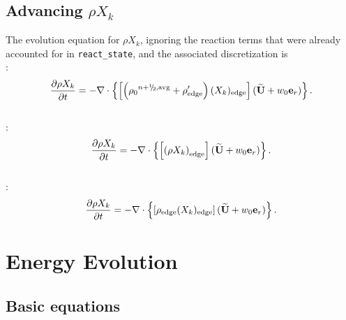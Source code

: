 \subsection{Advancing $\rho X_k$}\label{Advancing rhoX_k}
The evolution equation for $\rho X_k$, ignoring the reaction terms
that were already accounted for in {\tt react\_state}, and the
associated discretization is \\

:
\begin{equation}
\frac{\partial\rho X_k}{\partial t} = 
-\nabla\cdot\left\{\left[\left({\rho_0}^{n+\myhalf,{\rm avg}}
+ \rho'_\mathrm{edge} \right)(X_k)_\mathrm{edge} \right](\Ubt+w_0\eb_r)\right\}.
\end{equation} \\


:
\begin{equation}
\frac{\partial\rho X_k}{\partial t} = 
-\nabla\cdot\left\{\left[\left(\rho X_k \right)_\mathrm{edge} \right](\widetilde{{\bf U}}+w_0{\bf e}_r)\right\}.
\end{equation} \\


:
\begin{equation}
\frac{\partial\rho X_k}{\partial t} = 
-\nabla\cdot\left\{\left[\rho_\mathrm{edge} (X_k)_\mathrm{edge} \right](\widetilde{{\bf U}}+w_0{\bf e}_r)\right\}.
\end{equation}


\section{Energy Evolution}

\label{sec:pred:enthalpy}

\subsection{Basic equations}


